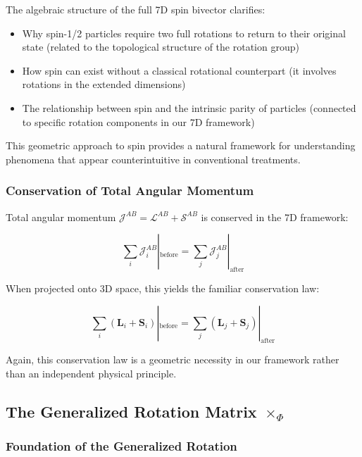 \documentclass{article}
\begin{document}
The algebraic structure of the full 7D spin bivector clarifies:
\begin{itemize}
\item Why spin-1/2 particles require two full rotations to return to their original state (related to the topological structure of the rotation group)
\item How spin can exist without a classical rotational counterpart (it involves rotations in the extended dimensions)
\item The relationship between spin and the intrinsic parity of particles (connected to specific rotation components in our 7D framework)
\end{itemize}

This geometric approach to spin provides a natural framework for understanding phenomena that appear counterintuitive in conventional treatments.

\subsubsection{Conservation of Total Angular Momentum}

Total angular momentum $\mathcal{J}^{AB} = \mathcal{L}^{AB} + \mathcal{S}^{AB}$ is conserved in the 7D framework:

\begin{equation}
\sum_i \mathcal{J}^{AB}_i|_{\text{before}} = \sum_j \mathcal{J}^{AB}_j|_{\text{after}}
\end{equation}

When projected onto 3D space, this yields the familiar conservation law:

\begin{equation}
\sum_i (\mathbf{L}_i + \mathbf{S}_i)|_{\text{before}} = \sum_j (\mathbf{L}_j + \mathbf{S}_j)|_{\text{after}}
\end{equation}

Again, this conservation law is a geometric necessity in our framework rather than an independent physical principle.

\subsection{The Generalized Rotation Matrix $\times_\Phi$}

\subsubsection{Foundation of the Generalized Rotation}
\end{document}
